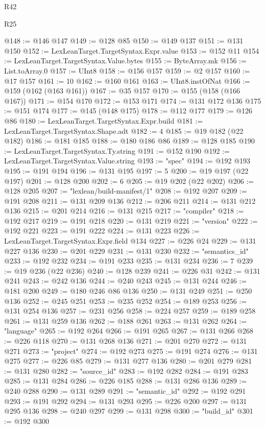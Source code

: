 \begin{lexlean}{R42}
\begin{lexlean}{R25}
\begin{coremodule}
{{{{{{{{{{{{{{{{{{{{{{{{{{{{{{{{{{{{{{{{{{{{{{{{{{{{{{{{{{{{{{{{{{{{{{{{{{{{{{{{{{{{{{{{{{{{{{{{{{{{{{{{{{{{{{{{{{{{{{{{{{{{{{{{{{{{{{{{{{{{{{{{{{{{{{{{{{{{{{{{{{{{{{{{{{{{{{{{{{{{{{{{{{{{{{{{{{{{{{{@148 := @146 @147
@149 := @128 @85
@150 := @149 @137
@151 := @131 @150
@152 := LexLeanTarget.TargetSyntax.Expr.value
@153 := @152 @11
@154 := LexLeanTarget.TargetSyntax.Value.bytes
@155 := ByteArray.mk
@156 := List.toArray.{0}
@157 := UInt8
@158 := @156 @157
@159 := @2 @157
@160 := @17 @157
@161 := 10
@162 := @160 @161
@163 := UInt8.instOfNat
@166 := @159 (@162 (@163 @161))
@167 := @35 @157
@170 := @155 (@158 (@166 @167))
@171 := @154 @170
@172 := @153 @171
@174 := @131 @172 @136
@175 := @151 @174
@177 := @145 (@148 @175)
@178 := @112 @177
@179 := @126 @86
@180 := LexLeanTarget.TargetSyntax.Expr.build
@181 := LexLeanTarget.TargetSyntax.Shape.adt
@182 := 4
@185 := @19 @182 (@22 @182)
@186 := @181 @185
@188 := @180 @186 @86
@189 := @128 @185
@190 := LexLeanTarget.TargetSyntax.Ty.string
@191 := @152 @190
@192 := LexLeanTarget.TargetSyntax.Value.string
@193 := "spec"
@194 := @192 @193
@195 := @191 @194
@196 := @131 @195
@197 := 5
@200 := @19 @197 (@22 @197)
@201 := @128 @200
@202 := 6
@205 := @19 @202 (@22 @202)
@206 := @128 @205
@207 := "lexlean/build-manifest/1"
@208 := @192 @207
@209 := @191 @208
@211 := @131 @209 @136
@212 := @206 @211
@214 := @131 @212 @136
@215 := @201 @214
@216 := @131 @215
@217 := "compiler"
@218 := @192 @217
@219 := @191 @218
@220 := @131 @219
@221 := "version"
@222 := @192 @221
@223 := @191 @222
@224 := @131 @223
@226 := LexLeanTarget.TargetSyntax.Expr.field @134
@227 := @226 @24
@229 := @131 @227 @136
@230 := @201 @229
@231 := @131 @230
@232 := "semantics_id"
@233 := @192 @232
@234 := @191 @233
@235 := @131 @234
@236 := 7
@239 := @19 @236 (@22 @236)
@240 := @128 @239
@241 := @226 @31
@242 := @131 @241
@243 := @242 @136
@244 := @240 @243
@245 := @131 @244
@246 := @181 @200
@249 := @180 @246 @86 @136
@250 := @131 @249
@251 := @250 @136
@252 := @245 @251
@253 := @235 @252
@254 := @189 @253
@256 := @131 @254 @136
@257 := @231 @256
@258 := @224 @257
@259 := @189 @258
@261 := @131 @259 @136
@262 := @188 @261
@263 := @131 @262
@264 := "language"
@265 := @192 @264
@266 := @191 @265
@267 := @131 @266
@268 := @226 @118
@270 := @131 @268 @136
@271 := @201 @270
@272 := @131 @271
@273 := "project"
@274 := @192 @273
@275 := @191 @274
@276 := @131 @275
@277 := @226 @85
@279 := @131 @277 @136
@280 := @201 @279
@281 := @131 @280
@282 := "source_id"
@283 := @192 @282
@284 := @191 @283
@285 := @131 @284
@286 := @226 @185
@288 := @131 @286 @136
@289 := @240 @288
@290 := @131 @289
@291 := "semantic_id"
@292 := @192 @291
@293 := @191 @292
@294 := @131 @293
@295 := @226 @200
@297 := @131 @295 @136
@298 := @240 @297
@299 := @131 @298
@300 := "build_id"
@301 := @192 @300
}}}}}}}}}}}}}}}}}}}}}}}}}}}}}}}}}}}}}}}}}}}}}}}}}}}}}}}}}}}}}}}}}}}}}}}}}}}}}}}}}}}}}}}}}}}}}}}}}}}}}}}}}}}}}}}}}}}}}}}}}}}}}}}}}}}}}}}}}}}}}}}}}}}}}}}}}}}}}}}}}}}}}}}}}}}}}}}}}}}}}}}}}}}}}}}}}}}}}}}
\end{coremodule}
\end{lexlean}
\end{lexlean}
